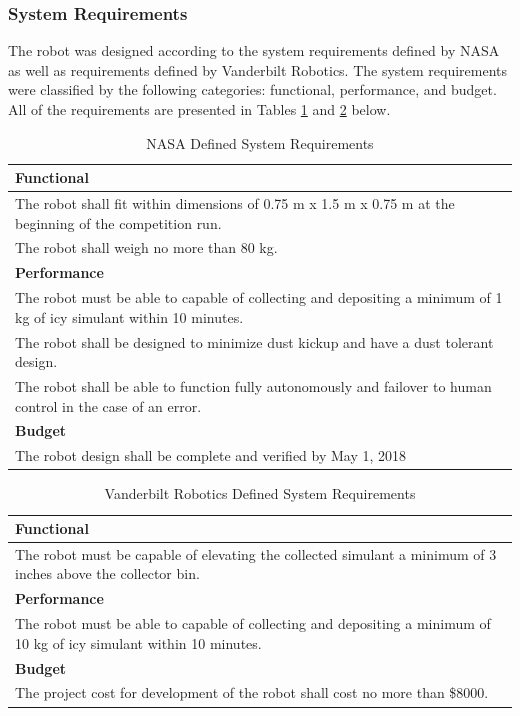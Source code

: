 \documentclass[class=article, crop=false]{standalone}
\begin{document}
	\subsubsection{System Requirements}
	The robot was designed according to the system requirements defined by NASA as well as requirements defined by Vanderbilt Robotics. The system requirements were classified by the following categories: functional, performance, and budget. All of the requirements are presented in Tables \ref{table:nasa_requirements} and  \ref{table:vur_requirements} below.
	\FloatBarrier
	\begin{table}[h]
	\centering
	\begin{tabular}{ | m{38em} | } 
 	\hline
 		\textbf{Functional} \\ 
 		\hline
 		The robot shall fit within dimensions of 0.75 m x 1.5 m x 0.75 m at the beginning of the competition run. \\ 
 		\hline
 		The robot shall weigh no more than 80 kg. \\ 
 		\hline
 		\textbf{Performance} \\ 
 		\hline
 		The robot must be able to capable of collecting and depositing a minimum of 1 kg of icy simulant within 10 minutes. \\
 		\hline
 		The robot shall be designed to minimize dust kickup and have a dust tolerant design.  \\
 		\hline
 		The robot shall be able to function fully autonomously and failover to human control in the case of an error. \\
 		\hline
 		\textbf{Budget} \\
 		\hline
		The robot design shall be complete and verified by May 1, 2018 \\
 	\hline
	\end{tabular}
	\caption{NASA Defined System Requirements}
		\label{table:nasa_requirements}
	\end{table}
	\FloatBarrier
	
	\FloatBarrier
	\begin{table}[h]
	\centering
	\begin{tabular}{ | m{38em} | } 
 	\hline
 		\textbf{Functional} \\ 
 		\hline
 		The robot must be capable of elevating the collected simulant a minimum of 3 inches above the collector bin. \\ 
 		\hline
 		\textbf{Performance} \\ 
 		\hline
 		The robot must be able to capable of collecting and depositing a minimum of 10 kg of icy simulant within 10 minutes. \\
 		\hline

 		\textbf{Budget} \\
 		\hline
		The project cost for development of the robot shall cost no more than \$8000. \\

 	\hline
 		
	\end{tabular}
	\caption{Vanderbilt Robotics Defined System Requirements}
		\label{table:vur_requirements}
	\end{table}
	\FloatBarrier
	
\end{document}
